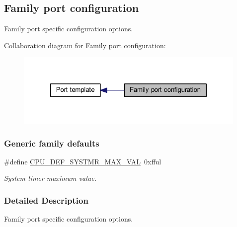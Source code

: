 \hypertarget{group__template__family__cfg}{\subsection{Family port configuration}
\label{group__template__family__cfg}
}


Family port specific configuration options.  


Collaboration diagram for Family port configuration\-:\nopagebreak
\begin{figure}[H]
\begin{center}
\leavevmode
\includegraphics[width=316pt]{group__template__family__cfg}
\end{center}
\end{figure}
\subsubsection*{Generic family defaults}
\begin{DoxyCompactItemize}
\item 
\#define \hyperlink{group__template__family__cfg_gaed6437f330e7be6f8d5a04a19cbe8776}{C\-P\-U\-\_\-\-D\-E\-F\-\_\-\-S\-Y\-S\-T\-M\-R\-\_\-\-M\-A\-X\-\_\-\-V\-A\-L}~0xfful
\begin{DoxyCompactList}\small\item\em System timer maximum value. \end{DoxyCompactList}\end{DoxyCompactItemize}


\subsubsection{Detailed Description}
Family port specific configuration options. 


